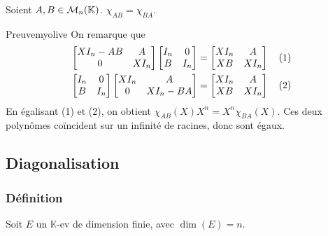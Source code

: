     \begin{prop}{}{}
        Soient $A,B \in \mathcal{M}_{n}(\mathbb{K})$. $\chi_{AB} = \chi_{BA}$.
    \end{prop}

    \begin{demo}{Preuve}{myolive}
        On remarque que 
        \begin{align*}
            \begin{bmatrix}
                X I_n - AB & A \\
                0 & X I_n 
            \end{bmatrix} \begin{bmatrix}
                I_n & 0 \\
                B & I_n
            \end{bmatrix} &= \begin{bmatrix}
                X I_n & A \\
                X B & X I_n
            \end{bmatrix} \quad (\text{1}) \\
            \begin{bmatrix}
                I_n & 0 \\
                B & I_n
            \end{bmatrix} \begin{bmatrix}
                X I_n & A \\
                0 & X I_n - BA 
            \end{bmatrix} &= \begin{bmatrix}
                X I_n & A \\
                X B & X I_n
            \end{bmatrix} \quad (\text{2})
        \end{align*}
        En égalisant (1) et (2), on obtient $\chi_{AB}(X) X^n = X^n \chi_{BA}(X)$. Ces deux polynômes coïncident sur un infinité de racines, donc sont égaux.
    \end{demo}

\subsection{Diagonalisation}

    \subsubsection{Définition}

    Soit $E$ un $\mathbb{K}$-ev de dimension finie, avec $\dim(E) = n$.

